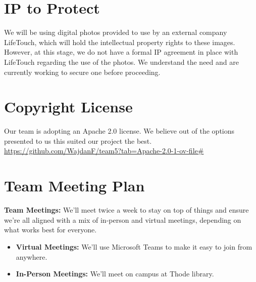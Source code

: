 \documentclass{article}
\begin{document}
\section{IP to Protect}

\newline
We will be using digital photos provided to use by an external company LifeTouch, which will hold the intellectual property rights to these images. However, at this stage, we do not have a formal IP agreement in place with LifeTouch regarding the use of the photos. We understand the need and are currently working to secure one before proceeding.

\section{Copyright License}

\newline
Our team is adopting an Apache 2.0 license. We believe out of the options presented to us this suited our project the best. \newline
\href{https://github.com/WajdanF/team5?tab=Apache-2.0-1-ov-file\#}{https://github.com/WajdanF/team5?tab=Apache-2.0-1-ov-file\#}



\section{Team Meeting Plan}





\newline
\textbf{Team Meetings:} We'll meet twice a week to stay on top of things and ensure we're all aligned with a mix of in-person and virtual meetings, depending on what works best for everyone.
\begin{itemize}
    \item \textbf{Virtual Meetings:} We’ll use Microsoft Teams to make it easy to join from anywhere.
    \item \textbf{In-Person Meetings:} We’ll meet on campus at Thode library.
\end{itemize}
\end{document}
